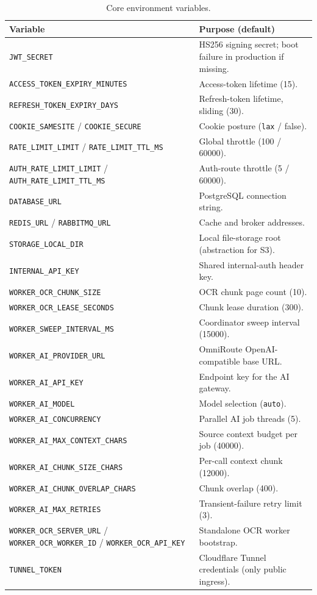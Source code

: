 \begin{table}[htbp]
\centering
\small
\begin{tabular}{@{}p{6.2cm}p{8cm}@{}}
\toprule
\textbf{Variable} & \textbf{Purpose (default)} \\
\midrule
\texttt{JWT\_SECRET} & HS256 signing secret; boot failure in production if
missing. \\
\texttt{ACCESS\_TOKEN\_EXPIRY\_MINUTES} & Access-token lifetime (15). \\
\texttt{REFRESH\_TOKEN\_EXPIRY\_DAYS} & Refresh-token lifetime, sliding (30). \\
\texttt{COOKIE\_SAMESITE} / \texttt{COOKIE\_SECURE} & Cookie posture
(\texttt{lax} / false). \\
\texttt{RATE\_LIMIT\_LIMIT} / \texttt{RATE\_LIMIT\_TTL\_MS} & Global
throttle (100 / 60000). \\
\texttt{AUTH\_RATE\_LIMIT\_LIMIT} / \texttt{AUTH\_RATE\_LIMIT\_TTL\_MS} &
Auth-route throttle (5 / 60000). \\
\texttt{DATABASE\_URL} & PostgreSQL connection string. \\
\texttt{REDIS\_URL} / \texttt{RABBITMQ\_URL} & Cache and broker addresses. \\
\texttt{STORAGE\_LOCAL\_DIR} & Local file-storage root (abstraction for S3). \\
\texttt{INTERNAL\_API\_KEY} & Shared internal-auth header key. \\
\texttt{WORKER\_OCR\_CHUNK\_SIZE} & OCR chunk page count (10). \\
\texttt{WORKER\_OCR\_LEASE\_SECONDS} & Chunk lease duration (300). \\
\texttt{WORKER\_SWEEP\_INTERVAL\_MS} & Coordinator sweep interval (15000). \\
\texttt{WORKER\_AI\_PROVIDER\_URL} & OmniRoute OpenAI-compatible base URL. \\
\texttt{WORKER\_AI\_API\_KEY} & Endpoint key for the AI gateway. \\
\texttt{WORKER\_AI\_MODEL} & Model selection (\texttt{auto}). \\
\texttt{WORKER\_AI\_CONCURRENCY} & Parallel AI job threads (5). \\
\texttt{WORKER\_AI\_MAX\_CONTEXT\_CHARS} & Source context budget per job (40000). \\
\texttt{WORKER\_AI\_CHUNK\_SIZE\_CHARS} & Per-call context chunk (12000). \\
\texttt{WORKER\_AI\_CHUNK\_OVERLAP\_CHARS} & Chunk overlap (400). \\
\texttt{WORKER\_AI\_MAX\_RETRIES} & Transient-failure retry limit (3). \\
\texttt{WORKER\_OCR\_SERVER\_URL} / \texttt{WORKER\_OCR\_WORKER\_ID} /
\texttt{WORKER\_OCR\_API\_KEY} & Standalone OCR worker bootstrap. \\
\texttt{TUNNEL\_TOKEN} & Cloudflare Tunnel credentials (only public ingress). \\
\bottomrule
\end{tabular}
\caption{Core environment variables.}
\label{tab:env}
\end{table}
